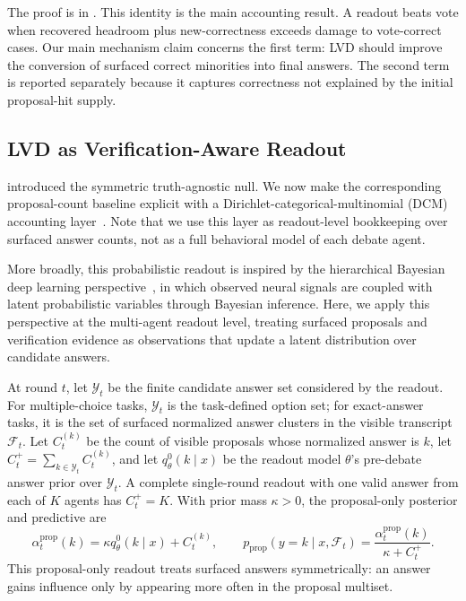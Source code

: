 The proof is in .
This identity is the main accounting result. A readout beats vote when recovered
headroom plus new-correctness exceeds damage to vote-correct cases. Our main
mechanism claim concerns the first term: LVD should improve the conversion of
surfaced correct minorities into final answers. The second term is reported
separately because it captures correctness not explained by the initial
proposal-hit supply.

\subsection{LVD as Verification-Aware Readout}
\label{subsec:lvd_model}
\label{subsec:lvd_recovery_condition}

 introduced the symmetric truth-agnostic null.
We now make the corresponding proposal-count baseline explicit with a
Dirichlet-categorical-multinomial (DCM) accounting layer~\citep{choi2026debate}. Note that we use this layer as readout-level bookkeeping over surfaced answer
counts, not as a full behavioral model of each debate agent.

More broadly, this probabilistic readout is inspired by the hierarchical
Bayesian deep learning perspective~\citep{BDL,BDLSurvey,VDI}, in which observed neural signals are coupled with latent probabilistic variables through
Bayesian inference. Here, we apply this perspective at the multi-agent
readout level, treating surfaced proposals and verification evidence as
observations that update a latent distribution over candidate answers.

At round $t$, let $\mathcal Y_t$ be the finite candidate answer set considered by the readout.
For multiple-choice tasks, $\mathcal Y_t$ is the task-defined option set; for
exact-answer tasks, it is the set of surfaced normalized answer clusters in the
visible transcript $\mathcal F_t$. Let $C_t^{(k)}$ be the count of visible
proposals whose normalized answer is $k$, let
$C_t^+=\sum_{k\in\mathcal Y_t}C_t^{(k)}$, and let
$q_\theta^0(k\mid x)$ be the readout model $\theta$'s pre-debate answer prior over
$\mathcal Y_t$. A complete single-round readout with one valid answer from each
of $K$ agents has $C_t^+=K$. With prior mass $\kappa>0$, the proposal-only
posterior and predictive are
\begin{equation}
    \alpha_t^{\mathrm{prop}}(k)
    =
    \kappa q_\theta^0(k\mid x)+C_t^{(k)},
    \qquad
    p_{\mathrm{prop}}(y=k\mid x,\mathcal F_t)
    =
    \frac{\alpha_t^{\mathrm{prop}}(k)}{\kappa+C_t^+}.
    \label{eq:prop_alpha}
\end{equation}
This proposal-only readout treats surfaced answers symmetrically: an answer
gains influence only by appearing more often in the proposal multiset.

